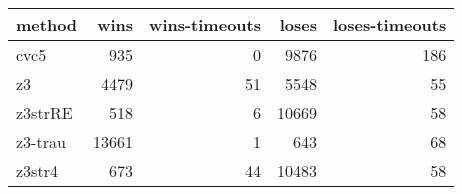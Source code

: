 \begin{tabular}{lrrrr}
\hline
 method   &   wins &   wins-timeouts &   loses &   loses-timeouts \\
\hline
 cvc5     &    935 &               0 &    9876 &              186 \\
 z3       &   4479 &              51 &    5548 &               55 \\
 z3strRE  &    518 &               6 &   10669 &               58 \\
 z3-trau  &  13661 &               1 &     643 &               68 \\
 z3str4   &    673 &              44 &   10483 &               58 \\
\hline
\end{tabular}
